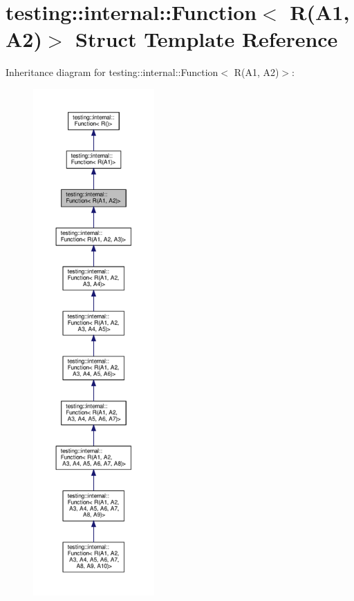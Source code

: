 \hypertarget{structtesting_1_1internal_1_1_function_3_01_r_07_a1_00_01_a2_08_4}{}\section{testing\+:\+:internal\+:\+:Function$<$ R(A1, A2)$>$ Struct Template Reference}
\label{structtesting_1_1internal_1_1_function_3_01_r_07_a1_00_01_a2_08_4}


Inheritance diagram for testing\+:\+:internal\+:\+:Function$<$ R(A1, A2)$>$\+:
\nopagebreak
\begin{figure}[H]
\begin{center}
\leavevmode
\includegraphics[height=550pt]{structtesting_1_1internal_1_1_function_3_01_r_07_a1_00_01_a2_08_4__inherit__graph}
\end{center}
\end{figure}


